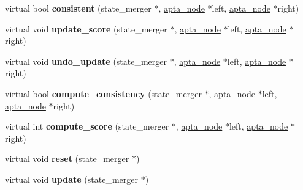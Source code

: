 \begin{DoxyCompactItemize}
\item 
virtual bool {\bfseries consistent} (state\+\_\+merger $\ast$, \hyperlink{classapta__node}{apta\+\_\+node} $\ast$left, \hyperlink{classapta__node}{apta\+\_\+node} $\ast$right)\hypertarget{classevaluation__function_ac9e2ec749349aef7b1aa48c4727d9af0}{}\label{classevaluation__function_ac9e2ec749349aef7b1aa48c4727d9af0}

\item 
virtual void {\bfseries update\+\_\+score} (state\+\_\+merger $\ast$, \hyperlink{classapta__node}{apta\+\_\+node} $\ast$left, \hyperlink{classapta__node}{apta\+\_\+node} $\ast$right)\hypertarget{classevaluation__function_ac648f41aeeb3ca018f3d625943ff646a}{}\label{classevaluation__function_ac648f41aeeb3ca018f3d625943ff646a}

\item 
virtual void {\bfseries undo\+\_\+update} (state\+\_\+merger $\ast$, \hyperlink{classapta__node}{apta\+\_\+node} $\ast$left, \hyperlink{classapta__node}{apta\+\_\+node} $\ast$right)\hypertarget{classevaluation__function_ae2ee16851119d2e3267f06d34ca9725b}{}\label{classevaluation__function_ae2ee16851119d2e3267f06d34ca9725b}

\item 
virtual bool {\bfseries compute\+\_\+consistency} (state\+\_\+merger $\ast$, \hyperlink{classapta__node}{apta\+\_\+node} $\ast$left, \hyperlink{classapta__node}{apta\+\_\+node} $\ast$right)\hypertarget{classevaluation__function_a752f38b55dec96d370bd0295f3e860ff}{}\label{classevaluation__function_a752f38b55dec96d370bd0295f3e860ff}

\item 
virtual int {\bfseries compute\+\_\+score} (state\+\_\+merger $\ast$, \hyperlink{classapta__node}{apta\+\_\+node} $\ast$left, \hyperlink{classapta__node}{apta\+\_\+node} $\ast$right)\hypertarget{classevaluation__function_a38fa304a626917a55a8c10671713c222}{}\label{classevaluation__function_a38fa304a626917a55a8c10671713c222}

\item 
virtual void {\bfseries reset} (state\+\_\+merger $\ast$)\hypertarget{classevaluation__function_a86f7463b8c56143b1a73b0d75f22d890}{}\label{classevaluation__function_a86f7463b8c56143b1a73b0d75f22d890}

\item 
virtual void {\bfseries update} (state\+\_\+merger $\ast$)\hypertarget{classevaluation__function_a2c68d6950ebdb9ea37e251525ad3b32f}{}\label{classevaluation__function_a2c68d6950ebdb9ea37e251525ad3b32f}


\end{DoxyCompactItemize}
